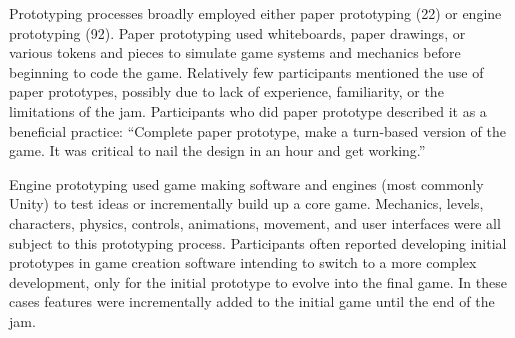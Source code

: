 \documentclass{sig-alternate}
\begin{document}


Prototyping processes broadly employed either paper prototyping (22) or engine prototyping (92).
Paper prototyping used whiteboards, paper drawings, or various tokens and pieces to simulate game systems and mechanics before beginning to code the game. Relatively few participants mentioned the use of paper prototypes, possibly due to lack of experience, familiarity, or the limitations of the jam. Participants who did paper prototype described it as a beneficial practice:
``Complete paper prototype, make a turn-based version of the game. It was critical to nail the design in an hour and get working.''

Engine prototyping used game making software and engines (most commonly Unity) to test ideas or incrementally build up a core game. Mechanics, levels, characters, physics, controls, animations, movement, and user interfaces were all subject to this prototyping process. 
Participants often reported developing initial prototypes in game creation software intending to switch to a more complex development, only for the initial prototype to evolve into the final game. In these cases features were incrementally added to the initial game until the end of the jam.
\end{document}
